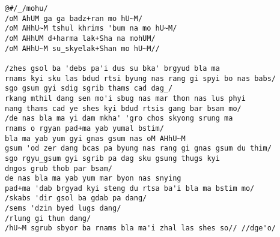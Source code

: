 \documentclass{article}
\begin{document}
\begin{verbatim}
@#/_/mohu/
/oM AhUM ga ga badz+ran mo hU~M/
/oM AHhU~M tshul khrims 'bum na mo hU~M/
/oM AHhUM d+harma lak+Sha na mohUM/
/oM AHhU~M su_skyelak+Shan mo hU~M//

/zhes gsol ba 'debs pa'i dus su bka' brgyud bla ma
rnams kyi sku las bdud rtsi byung nas rang gi spyi bo nas babs/
sgo gsum gyi sdig sgrib thams cad dag_/
rkang mthil dang sen mo'i sbug nas mar thon nas lus phyi
nang thams cad ye shes kyi bdud rtsis gang bar bsam mo/
/de nas bla ma yi dam mkha' 'gro chos skyong srung ma
rnams o rgyan pad+ma yab yumal bstim/
bla ma yab yum gyi gnas gsum nas oM AHhU~M
gsum 'od zer dang bcas pa byung nas rang gi gnas gsum du thim/
sgo rgyu_gsum gyi sgrib pa dag sku gsung thugs kyi
dngos grub thob par bsam/
de nas bla ma yab yum mar byon nas snying
pad+ma 'dab brgyad kyi steng du rtsa ba'i bla ma bstim mo/
/skabs 'dir gsol ba gdab pa dang/
/sems 'dzin byed lugs dang/
/rlung gi thun dang/
/hU~M sgrub sbyor ba rnams bla ma'i zhal las shes so// //dge'o/
\end{verbatim}
\end{document}
